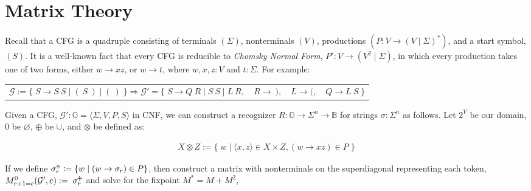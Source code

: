 \documentclass[sigplan,review,anonymous,acmsmall]{acmart}\settopmatter{printfolios=false,printccs=false,printacmref=false}
\begin{document}
\section{Matrix Theory}\label{sec:matrix}

Recall that a CFG is a quadruple consisting of terminals $(\Sigma)$, nonterminals $(V)$, productions $(P\colon V \rightarrow (V \mid \Sigma)^*)$, and a start symbol, $(S)$. It is a well-known fact that every CFG is reducible to \textit{Chomsky Normal Form}, $P'\colon V \rightarrow (V^2 \mid \Sigma)$, in which every production takes one of two forms, either $w \rightarrow xz$, or $w \rightarrow t$, where $w, x, z: V$ and $t: \Sigma$. For example:\vspace{-3pt}

\begin{table}[H]
\begin{tabular}{llll}
$\mathcal{G}:=\big\{\;S \rightarrow S\:S \mid (\:S\:) \mid (\:)\;\big\} \Longrightarrow \mathcal{G}'=\big\{\;S\rightarrow Q\:R \mid S\:S \mid L\:R,$ & $R \rightarrow\:),$ & $L \rightarrow (,$ & $Q\rightarrow L\:S\;\big\}$
\end{tabular}
\end{table}\vspace{-8pt}

\noindent Given a CFG, $\mathcal{G}' : \mathbb{G} = \langle \Sigma, V, P, S\rangle$ in CNF, we can construct a recognizer $R: \mathbb{G} \rightarrow \Sigma^n \rightarrow \mathbb{B}$ for strings $\sigma: \Sigma^n$ as follows. Let $2^V$ be our domain, $0$ be $\varnothing$, $\oplus$ be $\cup$, and $\otimes$ be defined as:\vspace{-10pt}

\begin{align}
X \otimes Z := \big\{\;w \mid \langle x, z\rangle \in X \times Z, (w\rightarrow xz) \in P\;\big\}
\end{align}

\noindent If we define $\sigma_r^{\shortuparrow\hspace{-5pt}\shortrightarrow} \coloneqq \{w \mid (w \rightarrow \sigma_r) \in P\}$, then construct a matrix with nonterminals on the superdiagonal representing each token, $M^0_{r+1=c}(\mathcal{G}', e) := \;\sigma_r^{\shortuparrow\hspace{-5pt}\shortrightarrow}$ and solve for the fixpoint $M^* = M + M^2$,\vspace{-10pt}
\end{document}
